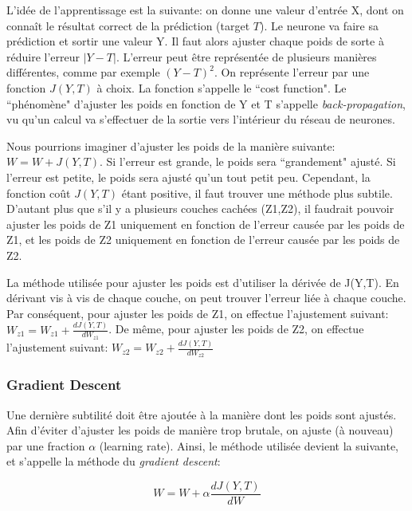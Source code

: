 \documentclass[11pt,a4paper]{report}
\begin{document}
    \par L'idée de l'apprentissage est la suivante: on donne une valeur d'entrée X, dont on connaît le résultat correct de la prédiction (target $T$). Le neurone va faire sa prédiction et sortir une valeur Y. Il faut alors ajuster chaque poids de sorte à réduire l'erreur $|Y-T|$. L'erreur peut être représentée de plusieurs manières différentes, comme par exemple $(Y - T)^2$. On représente l'erreur par une fonction $J(Y, T)$ à choix. La fonction s'appelle le ``cost function". Le ``phénomène" d'ajuster les poids en fonction de Y et T s'appelle \textit{back-propagation}, vu qu'un calcul va s'effectuer de la sortie vers l'intérieur du réseau de neurones. 

    \par Nous pourrions imaginer d'ajuster les poids de la manière suivante: $W = W + J(Y,T)$. Si l'erreur est grande, le poids sera ``grandement" ajusté. Si l'erreur est petite, le poids sera ajusté qu'un tout petit peu. Cependant, la fonction coût $J(Y,T)$ étant positive, il faut trouver une méthode plus subtile. D'autant plus que s'il y a plusieurs couches cachées (Z1,Z2), il faudrait pouvoir ajuster les poids de Z1 uniquement en fonction de l'erreur causée par les poids de Z1, et les poids de Z2 uniquement en fonction de l'erreur causée par les poids de Z2. 

    \par La méthode utilisée pour ajuster les poids est d'utiliser la dérivée de J(Y,T). En dérivant vis à vis de chaque couche, on peut trouver l'erreur liée à chaque couche. Par conséquent, pour ajuster les poids de Z1, on effectue l'ajustement suivant: $W_{z1} = W_{z1} + \frac{dJ(Y,T)}{dW_{z1}}$. De même, pour ajuster les poids de Z2, on effectue l'ajustement suivant: $W_{z2} = W_{z2} + \frac{dJ(Y,T)}{dW_{z2}}$
  
  \subsubsection{Gradient Descent}
  
    \par Une dernière subtilité doit être ajoutée à la manière dont les poids sont ajustés. Afin d'éviter d'ajuster les poids de manière trop brutale, on ajuste (à nouveau) par une fraction $\alpha$ (learning rate). Ainsi, le méthode utilisée devient la suivante, et s'appelle la méthode du \textit{gradient descent}: 
    
    $$W = W + \alpha \frac{dJ(Y,T)}{dW}$$
    
\end{document}
